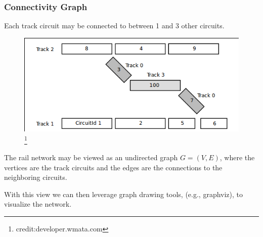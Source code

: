 \documentclass[t]{beamer}
\begin{document}
\begin{frame}
\frametitle{Connectivity Graph}
Each track circuit may be connected to between 1 and 3 other circuits.

\begin{center}
\begin{figure}
  \includegraphics[scale=0.4]{switch.png}
  \footnote{credit:developer.wmata.com}
\end{figure}
\end{center}

\vfill

The rail network may be viewed as an undirected graph
$G=(V,E)$, where the vertices are the track circuits and the edges are the
connections to the neighboring circuits.

\vfill

With this view we can then leverage graph drawing tools, (e.g., graphviz), to
visualize the network.


\end{frame}
\end{document}
